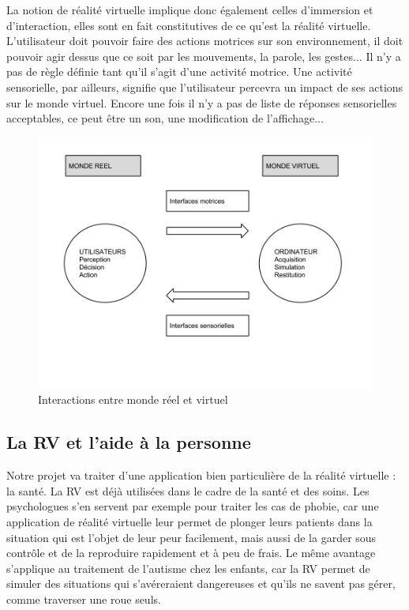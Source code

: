 La notion de réalité virtuelle implique donc également celles d'immersion et d'interaction, elles sont en fait constitutives de ce  qu'est la réalité virtuelle. L'utilisateur doit pouvoir faire des actions motrices sur son environnement, il doit pouvoir agir dessus que ce soit par les mouvements, la parole, les gestes... Il n'y a pas de règle définie tant qu'il s'agit d'une activité motrice. 
Une activité sensorielle, par ailleurs, signifie que l'utilisateur percevra un impact de ses actions sur le monde virtuel. Encore une fois il n'y a pas de liste de réponses sensorielles acceptables, ce peut être un son, une modification de l'affichage...
\begin{figure}
  \caption{Interactions entre monde réel et virtuel}
  \centering
  \includegraphics[scale=0.5,bb=0 0 960 720]{1-PreEtude/img/graphe_interfaces.png}
\end{figure}	%

\subsection{La RV et l'aide à la personne}
Notre projet va traiter d'une application bien particulière de la réalité virtuelle : la santé. La RV est déjà utilisées dans le cadre de la santé et des soins. Les psychologues s'en servent par exemple pour traiter les cas de phobie, car une application de réalité virtuelle leur permet de plonger leurs patients dans la situation qui est l'objet de leur peur facilement, mais aussi de la garder sous contrôle et de la reproduire rapidement et à peu de frais. Le même avantage s'applique au traitement de l'autisme chez les enfants, car la RV permet de simuler des situations qui s'avéreraient dangereuses et qu'ils ne savent pas gérer, comme traverser une roue seuls.\\

